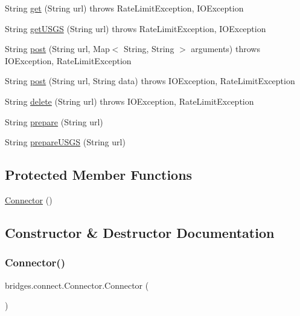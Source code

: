 \begin{DoxyCompactItemize}
\item 
String \hyperlink{classbridges_1_1connect_1_1_connector_aec8d54bf707c50d6f8173a0c1640fcd5}{get} (String url)  throws Rate\+Limit\+Exception, I\+O\+Exception 
\item 
String \hyperlink{classbridges_1_1connect_1_1_connector_a1781405c9b38c338bce042bf7ff23eaf}{get\+U\+S\+GS} (String url)  throws Rate\+Limit\+Exception, I\+O\+Exception 
\item 
String \hyperlink{classbridges_1_1connect_1_1_connector_a88e465aed707d59b96958dcc946ff6b4}{post} (String url, Map$<$ String, String $>$ arguments)  throws I\+O\+Exception, Rate\+Limit\+Exception 
\item 
String \hyperlink{classbridges_1_1connect_1_1_connector_a4b8978743a8c230b86500f5a00cb2697}{post} (String url, String data)  throws I\+O\+Exception, 		\+Rate\+Limit\+Exception 
\item 
String \hyperlink{classbridges_1_1connect_1_1_connector_ac0a6f796f1ebcf312b89a7d233c8ac91}{delete} (String url)  throws I\+O\+Exception, Rate\+Limit\+Exception 
\item 
String \hyperlink{classbridges_1_1connect_1_1_connector_a507ee5a9d8c812ffd4629cbd22f27373}{prepare} (String url)
\item 
String \hyperlink{classbridges_1_1connect_1_1_connector_aa0201e2569358ff906d3c14d654711e5}{prepare\+U\+S\+GS} (String url)
\end{DoxyCompactItemize}
\subsection*{Protected Member Functions}
\begin{DoxyCompactItemize}
\item 
\hyperlink{classbridges_1_1connect_1_1_connector_a167800699b2d191bd625d9c8c8cd9e6f}{Connector} ()
\end{DoxyCompactItemize}


\subsection{Constructor \& Destructor Documentation}
\mbox{\label{classbridges_1_1connect_1_1_connector_a167800699b2d191bd625d9c8c8cd9e6f}} 
\subsubsection{\texorpdfstring{Connector()}{Connector()}}
{\footnotesize\ttfamily bridges.\+connect.\+Connector.\+Connector (\begin{DoxyParamCaption}{ }\end{DoxyParamCaption})\hspace{0.3cm}{\ttfamily [protected]}}



